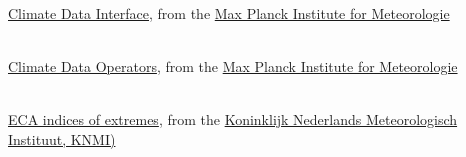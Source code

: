 \begin{thebibliography}{xx}


 \ \\
  \href{https://code.mpimet.mpg.de/projects/cdi}
       {Climate Data Interface},
  from the
  \href{http://www.mpimet.mpg.de}
       {Max Planck Institute for Meteorologie}


 \ \\
  \href{https://code.mpimet.mpg.de/projects/cdo}
       {Climate Data Operators},
  from the
  \href{http://www.mpimet.mpg.de}
       {Max Planck Institute for Meteorologie}


 \ \\
  \href{http://eca.knmi.nl/indicesextremes/}
       {ECA indices of extremes},
  from the
  \href{http://knmi.nl/}
       {Koninklijk Nederlands Meteorologisch Instituut, KNMI)}


\end{thebibliography}
